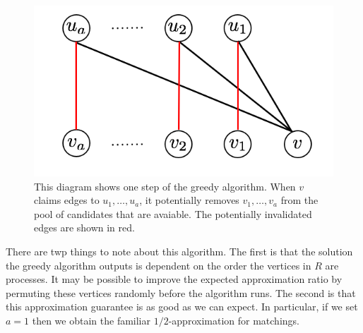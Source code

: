 \begin{figure}[h]
\centering
\includegraphics[width=.5\textwidth]{greedy.png}
\begin{minipage}[h]{.8\linewidth}
\caption{This diagram shows one step of the greedy algorithm. When $v$ claims edges to $u_1,\ldots, u_a$, it potentially removes $v_1,\ldots, v_a$ from the pool of candidates that are avaiable. The potentially invalidated edges are shown in red.}
\end{minipage}
\end{figure}

There are twp things to note about this algorithm. The first is
that the solution the greedy algorithm outputs is dependent on the
order the vertices in $R$ are processes. It may be possible to improve
the expected approximation ratio by permuting these vertices randomly
before the algorithm runs. The second is that this approximation
guarantee is as good as we can expect. In particular, if we set $a=1$
then we obtain the familiar $1/2$-approximation for matchings.

\label{worst-vs-avg}